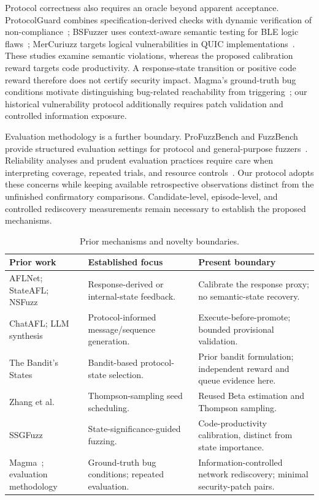 \documentclass[final,5p,times,number]{elsarticle}
\begin{document}
Protocol correctness also requires an oracle beyond apparent acceptance. ProtocolGuard combines specification-derived checks with dynamic verification of non-compliance~\cite{protocolguard2026}; BSFuzzer uses context-aware semantic testing for BLE logic flaws~\cite{bsfuzzer2026}; MerCuriuzz targets logical vulnerabilities in QUIC implementations~\cite{mercuriuzz2026}. These studies examine semantic violations, whereas the proposed calibration reward targets code productivity. A response-state transition or positive code reward therefore does not certify security impact. Magma's ground-truth bug conditions motivate distinguishing bug-related reachability from triggering~\cite{magma2020}; our historical vulnerability protocol additionally requires patch validation and controlled information exposure.

Evaluation methodology is a further boundary. ProFuzzBench and FuzzBench provide structured evaluation settings for protocol and general-purpose fuzzers~\cite{profuzzbench_benchmark_stateful_protocol_2021,fuzzbench2021}. Reliability analyses and prudent evaluation practices require care when interpreting coverage, repeated trials, and resource controls~\cite{reliability_benchmarking_2022,sok_prudent_evaluation_practices_2024}. Our protocol adopts these concerns while keeping available retrospective observations distinct from the unfinished confirmatory comparisons. Candidate-level, episode-level, and controlled rediscovery measurements remain necessary to establish the proposed mechanisms.

\begin{table}[!tbp]
\centering\small
\caption{Prior mechanisms and novelty boundaries.}
\label{tab:novelty}
\begin{tabularx}{\textwidth}{l Y Y}
\toprule
Prior work & Established focus & Present boundary \\
\midrule
AFLNet; StateAFL; NSFuzz & Response-derived or internal-state feedback. & Calibrate the response proxy; no semantic-state recovery. \\
ChatAFL; LLM synthesis & Protocol-informed message/sequence generation. & Execute-before-promote; bounded provisional validation. \\
The Bandit's States~\cite{bandits_states2023} & Bandit-based protocol-state selection. & Prior bandit formulation; independent reward and queue evidence here. \\
Zhang et al.~\cite{zhang2026thompson} & Thompson-sampling seed scheduling. & Reused Beta estimation and Thompson sampling. \\
SSGFuzz~\cite{ssgfuzz2026} & State-significance-guided fuzzing. & Code-productivity calibration, distinct from state importance. \\
Magma~\cite{magma2020}; evaluation methodology & Ground-truth bug conditions; repeated evaluation. & Information-controlled network rediscovery; minimal security-patch pairs. \\
\bottomrule
\end{tabularx}
\end{table}
\end{document}
